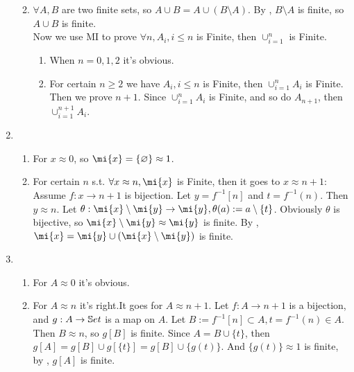 \documentclass{ctexart}
\begin{document}
\begin{solution}
\begin{enumerate}
\begin{enumerate}
\begin{enumerate}
            \end{enumerate} 
            \item 
            $\forall A,B$ are two finite sets, so $A\cup B=A\cup (B\setminus A)$. By , $B\setminus A$ is finite, so $A\cup B$ is finite. \\
            Now we use MI to prove $\forall n, A_i,i\leq n$ is Finite, then $\cup_{i=1}^n$ is Finite.
            \begin{enumerate}
                \item When $n=0,1,2$ it's obvious.
                \item For certain $n\geq 2$ we have $A_i,i\leq n$ is Finite, then $\cup_{i=1}^nA_i$ is Finite. Then we prove $n+1$. Since $\cup_{i=1}^nA_i$ is Finite, and so do $A_{n+1}$, then $\cup_{i=1}^{n+1}A_i$.
            \end{enumerate}
            
     \end{enumerate}   
     \item \begin{enumerate}
        \item For $x\approx 0$, so $\mi{x}=\{\varnothing\}\approx 1$.
        \item For certain $n$ s.t. $\forall x\approx n,\mi{x}$ is Finite, then it goes to $x\approx n+1$: Assume $f:x\to n+1$ is bijection. Let $y=f^{-1}[n]$ and $t=f^{-1}(n)$. Then $y\approx n$. Let $\theta:\mi{x}\setminus \mi{y}\to \mi{y},\theta(a):=a\setminus \{t\}$. Obviously $\theta$ is bijective, so $\mi{x}\setminus\mi{y}\approx \mi{y}$ is finite. By , $\mi{x}=\mi{y}\cup(\mi{x}\setminus\mi{y})$ is finite. 
     \end{enumerate}
      
     \item \begin{enumerate}
        \item For $A\approx 0$ it's obvious. 
        \item For $A\approx n$ it's right.It goes for $A\approx n+1$. Let $f:A\to n+1$ is a bijection, and $g:A\to\mathbb{S}et$ is a map on $A$. Let $B:=f^{-1}[n]\subset A,t=f^{-1}(n)\in A$. Then $B\approx n$, so $g[B]$ is finite. Since $A=B\cup\{t\}$, then $g[A]=g[B]\cup g[\{t\}]=g[B]\cup \{g(t)\}$. And $ \{g(t)\}\approx 1$ is finite, by , $g[A]$ is finite.
     \end{enumerate}
     
 
    \end{enumerate}
    
   \end{solution}
\end{document}
